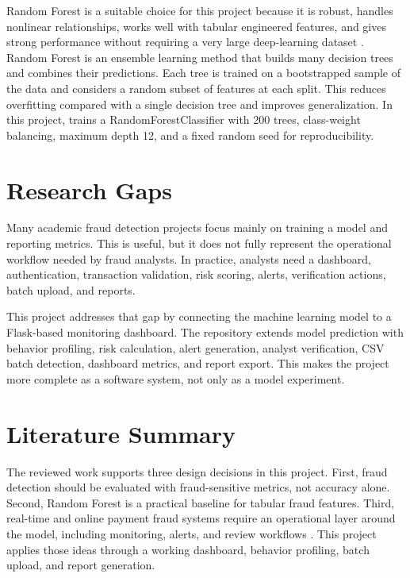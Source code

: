 \documentclass[12pt,a4paper]{report}
\begin{document}
Random Forest is a suitable choice for this project because it is robust, handles nonlinear relationships, works well with tabular engineered features, and gives strong performance without requiring a very large deep-learning dataset \cite{adesina2024creditcard,mallidi2021analysis}. Random Forest is an ensemble learning method that builds many decision trees and combines their predictions. Each tree is trained on a bootstrapped sample of the data and considers a random subset of features at each split. This reduces overfitting compared with a single decision tree and improves generalization. In this project,  trains a RandomForestClassifier with 200 trees, class-weight balancing, maximum depth 12, and a fixed random seed for reproducibility.

\section{Research Gaps}
Many academic fraud detection projects focus mainly on training a model and reporting metrics. This is useful, but it does not fully represent the operational workflow needed by fraud analysts. In practice, analysts need a dashboard, authentication, transaction validation, risk scoring, alerts, verification actions, batch upload, and reports.

This project addresses that gap by connecting the machine learning model to a Flask-based monitoring dashboard. The repository extends model prediction with behavior profiling, risk calculation, alert generation, analyst verification, CSV batch detection, dashboard metrics, and report export. This makes the project more complete as a software system, not only as a model experiment.

\section{Literature Summary}
The reviewed work supports three design decisions in this project. First, fraud detection should be evaluated with fraud-sensitive metrics, not accuracy alone. Second, Random Forest is a practical baseline for tabular fraud features. Third, real-time and online payment fraud systems require an operational layer around the model, including monitoring, alerts, and review workflows \cite{tadvi2021realtime,almazroi2023onlinepayment}. This project applies those ideas through a working dashboard, behavior profiling, batch upload, and report generation.

\end{document}
